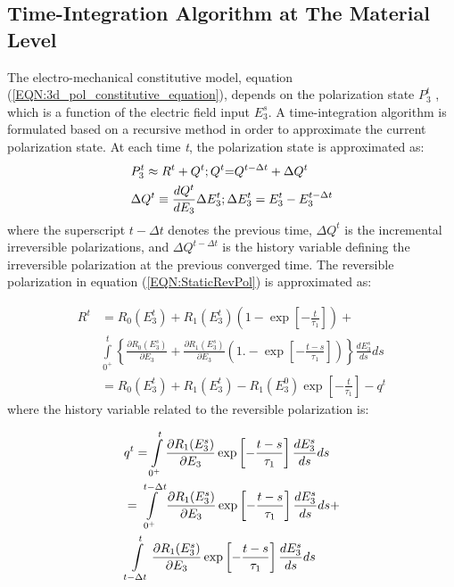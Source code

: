 \subsection{Time-Integration Algorithm at The Material Level}
The electro-mechanical constitutive model, equation (\ref{EQN:3d_pol_constitutive_equation}), depends on the polarization state $P^t_3$ ,
 which is a function of the electric field input $E^s_3$. 
 A time-integration algorithm is formulated based on a recursive method in order to approximate the current polarization state. 
 At each time \textit{t}, the polarization state is approximated as:
\begin{equation}
\begin{aligned}
&P_3^t \approx {R^t} + {Q^t};{\rm{    }}{Q^t}{\rm{ = }}{Q^{t - \Delta t}} + \Delta {Q^t}\\
&\Delta {Q^t} \equiv \frac{{d{Q^t}}}{{d{E_3}}}\Delta E_3^t;{\rm{     }}\Delta E_3^t = E_3^t - E_3^{t - \Delta t}
\label{EQN:polarization_state_approximation}
\end{aligned}
\end{equation}  
where the superscript $t-\Delta t$ denotes the previous time, $\Delta Q^t$ 
 is the incremental irreversible polarizations, and $\Delta Q^{t-\Delta t}$ is the history variable defining the irreversible polarization at the previous converged time. 
 The reversible polarization in equation (\ref{EQN:StaticRevPol}) is approximated as:

\begin{equation}
\begin{aligned}
{R^t} 
&= {R_0}(E_3^t) + {R_1}(E_3^t)\left( {1 - \exp \left[ { - \frac{t}{{{\tau _1}}}} \right]} \right) + \\
& \int\limits_{{0^ + }}^t {\left\{ {\frac{{\partial {R_0}(E_3^s)}}{{\partial {E_3}}} + \frac{{\partial {R_1}(E_3^s)}}{{\partial {E_3}}}\left( {1. - \exp \left[ { - \frac{{t - s}}{{{\tau _1}}}} \right]} \right)} \right\}\frac{{dE_3^s}}{{ds}}ds} \\
&={R_0}(E_3^t) + {R_1}(E_3^t) - {R_1}(E_3^0)\exp \left[ { - \frac{t}{{{\tau _1}}}} \right] - {q^t}
\label{EQN:reversible_polarization_state_approximation}
\end{aligned}
\end{equation}  
where the history variable related to the reversible polarization is: 

\begin{equation}  
\begin{aligned}
&{q^t} = \int\limits_{{0^ + }}^t {\frac{{\partial {R_1}(E_3^s)}}{{\partial {E_3}}}\exp \left[ { - \frac{{t - s}}{{{\tau _1}}}} \right]\frac{{dE_3^s}}{{ds}}ds} \\
&{\rm{  }} = \int\limits_{{0^ + }}^{t - \Delta t} {\frac{{\partial {R_1}(E_3^s)}}{{\partial {E_3}}}\exp \left[ { - \frac{{t - s}}{{{\tau _1}}}} \right]\frac{{dE_3^s}}{{ds}}ds}  + \\
& \int\limits_{t - \Delta t}^t {\frac{{\partial {R_1}(E_3^s)}}{{\partial {E_3}}}\exp \left[ { - \frac{{t - s}}{{{\tau _1}}}} \right]\frac{{dE_3^s}}{{ds}}ds} \\
\end{aligned} 
\label{EQN:history_variable_polarization}
\end{equation}  

